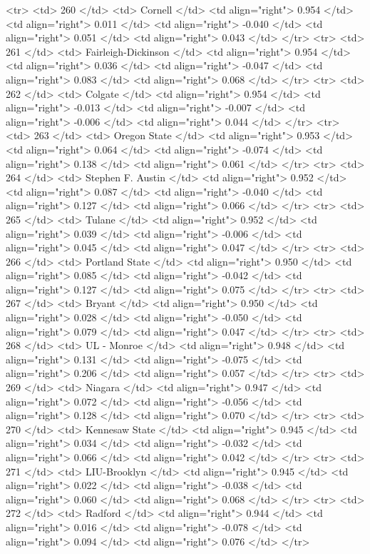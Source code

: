   <tr> <td> 260 </td> <td> Cornell </td> <td align="right"> 0.954 </td> <td align="right"> 0.011 </td> <td align="right"> -0.040 </td> <td align="right"> 0.051 </td> <td align="right"> 0.043 </td> </tr>
  <tr> <td> 261 </td> <td> Fairleigh-Dickinson </td> <td align="right"> 0.954 </td> <td align="right"> 0.036 </td> <td align="right"> -0.047 </td> <td align="right"> 0.083 </td> <td align="right"> 0.068 </td> </tr>
  <tr> <td> 262 </td> <td> Colgate </td> <td align="right"> 0.954 </td> <td align="right"> -0.013 </td> <td align="right"> -0.007 </td> <td align="right"> -0.006 </td> <td align="right"> 0.044 </td> </tr>
  <tr> <td> 263 </td> <td> Oregon State </td> <td align="right"> 0.953 </td> <td align="right"> 0.064 </td> <td align="right"> -0.074 </td> <td align="right"> 0.138 </td> <td align="right"> 0.061 </td> </tr>
  <tr> <td> 264 </td> <td> Stephen F. Austin </td> <td align="right"> 0.952 </td> <td align="right"> 0.087 </td> <td align="right"> -0.040 </td> <td align="right"> 0.127 </td> <td align="right"> 0.066 </td> </tr>
  <tr> <td> 265 </td> <td> Tulane </td> <td align="right"> 0.952 </td> <td align="right"> 0.039 </td> <td align="right"> -0.006 </td> <td align="right"> 0.045 </td> <td align="right"> 0.047 </td> </tr>
  <tr> <td> 266 </td> <td> Portland State </td> <td align="right"> 0.950 </td> <td align="right"> 0.085 </td> <td align="right"> -0.042 </td> <td align="right"> 0.127 </td> <td align="right"> 0.075 </td> </tr>
  <tr> <td> 267 </td> <td> Bryant </td> <td align="right"> 0.950 </td> <td align="right"> 0.028 </td> <td align="right"> -0.050 </td> <td align="right"> 0.079 </td> <td align="right"> 0.047 </td> </tr>
  <tr> <td> 268 </td> <td> UL - Monroe </td> <td align="right"> 0.948 </td> <td align="right"> 0.131 </td> <td align="right"> -0.075 </td> <td align="right"> 0.206 </td> <td align="right"> 0.057 </td> </tr>
  <tr> <td> 269 </td> <td> Niagara </td> <td align="right"> 0.947 </td> <td align="right"> 0.072 </td> <td align="right"> -0.056 </td> <td align="right"> 0.128 </td> <td align="right"> 0.070 </td> </tr>
  <tr> <td> 270 </td> <td> Kennesaw State </td> <td align="right"> 0.945 </td> <td align="right"> 0.034 </td> <td align="right"> -0.032 </td> <td align="right"> 0.066 </td> <td align="right"> 0.042 </td> </tr>
  <tr> <td> 271 </td> <td> LIU-Brooklyn </td> <td align="right"> 0.945 </td> <td align="right"> 0.022 </td> <td align="right"> -0.038 </td> <td align="right"> 0.060 </td> <td align="right"> 0.068 </td> </tr>
  <tr> <td> 272 </td> <td> Radford </td> <td align="right"> 0.944 </td> <td align="right"> 0.016 </td> <td align="right"> -0.078 </td> <td align="right"> 0.094 </td> <td align="right"> 0.076 </td> </tr>
